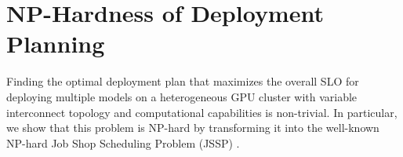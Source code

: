 \appendix
\clearpage





\section{NP-Hardness of Deployment Planning}
\label{appendix:a}
Finding the optimal deployment plan that maximizes the overall SLO for deploying multiple models on a heterogeneous GPU cluster with variable interconnect topology and computational capabilities is non-trivial. In particular, we show that this problem is NP-hard by transforming it into the well-known NP-hard Job Shop Scheduling Problem (JSSP) \cite{sotskov1995np,omar2006job}. 


